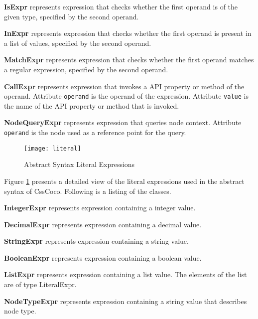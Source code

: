 \documentclass[parskip=full]{uvamscse}
\begin{document}
\begin{description}
\item\textbf{IsExpr} represents expression that checks whether the first operand is of the given type, specified by the second operand.

\item\textbf{InExpr} represents expression that checks whether the first operand is present in a list of values, specified by the second operand.

\item\textbf{MatchExpr} represents expression that checks whether the first operand matches a regular expression, specified by the second operand.

\item\textbf{CallExpr} represents expression that invokes a API property or method of the operand. Attribute \texttt{operand} is the operand of the expression. Attribute \texttt{value} is the name of the API property or method that is invoked.

\item\textbf{NodeQueryExpr} represents expression that queries node context. Attribute \texttt{operand} is the node used as a reference point for the query.

\end{description}

\begin{figure}[h!]
  \centering
  \caption{Abstract Syntax Literal Expressions}
  \label{fig:literal}
  \texttt{[image: literal]}
\end{figure}

Figure \ref{fig:literal} presents a detailed view of the literal expressions used in the abstract syntax of CssCoco. Following is a listing of the classes. 

\begin{description}

\item\textbf{IntegerExpr} represents expression containing a integer value.

\item\textbf{DecimalExpr} represents expression containing a decimal value.

\item\textbf{StringExpr} represents expression containing a string value.

\item\textbf{BooleanExpr} represents expression containing a boolean value.

\item\textbf{ListExpr} represents expression containing a list value. The elements of the list are of type LiteralExpr.

\item\textbf{NodeTypeExpr} represents expression containing a string value that describes node type.

\end{description}
\end{document}
